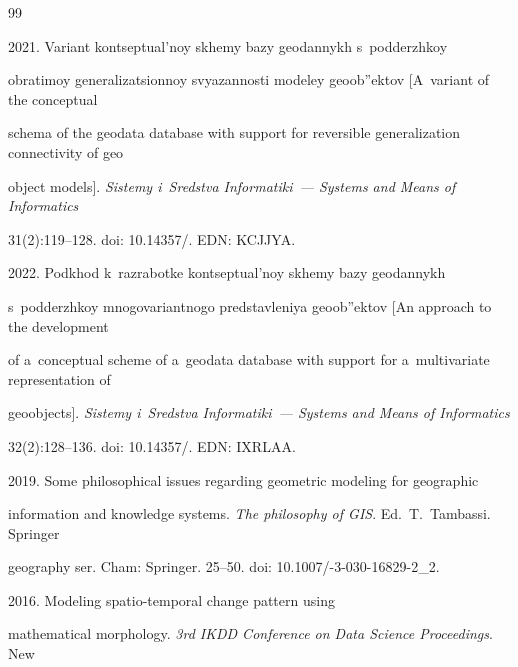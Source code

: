 {\small\frenchspacing


{ %




\begin{thebibliography}{99}




 2021. Va\-ri\-ant kon\-tsep\-tu\-al'\-noy skhe\-my ba\-zy geo\-dan\-nykh s~pod\-derzh\-koy 


ob\-ra\-ti\-moy ge\-ne\-ra\-li\-za\-tsi\-on\-noy svya\-zan\-nosti mo\-de\-ley geo\-ob''\-ek\-tov [A~variant of the conceptual 


schema of the geodata database with support for reversible generalization connectivity of geo 


object models]. \textit{Sis\-te\-my i~Sredst\-va In\-for\-ma\-ti\-ki~--- Systems and Means of Informatics} 


31(2):119--128. doi: 10.14357\!/.  EDN: KCJJYA.




 2022. Pod\-khod k~raz\-ra\-bot\-ke kon\-tsep\-tu\-al'\-noy skhe\-my ba\-zy geo\-dan\-nykh 


s~pod\-derz\-hkoy mno\-go\-va\-ri\-ant\-no\-go pred\-stav\-le\-niya geo\-ob''\-ek\-tov [An approach to the development 


of a~conceptual scheme of a~geodata database with support for a~multivariate representation of 


geoobjects]. \textit{Sis\-te\-my i~Sredst\-va In\-for\-ma\-ti\-ki~--- Systems and Means of Informatics} 


32(2):128--136. doi: 10.14357\!/. EDN: IXRLAA.




 2019. Some philosophical issues regarding geometric modeling for geographic 


information and knowledge systems. \textit{The philosophy of GIS}. Ed.\ T.~Tambassi. Springer 


geography ser. Cham: Springer. 25--50. doi: 10.1007\!/-3-030-16829-2\_2.







 2016. Modeling spatio-temporal change pattern using 


mathematical morphology. \textit{3rd IKDD Conference on Data Science Proceedings}. New 



\end{thebibliography}}}
